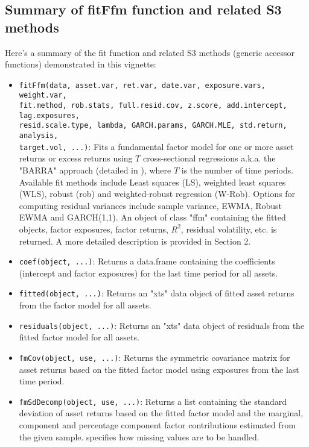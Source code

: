 \documentclass[a4paper]{article}\usepackage[]{graphicx}\usepackage[]{color}
\begin{document}
\subsection{Summary of fitFfm function and related S3 methods}

Here's a summary of the fit function and related S3 methods (generic accessor functions) demonstrated in this vignette:

\begin{itemize}

\item \verb"fitFfm(data, asset.var, ret.var, date.var, exposure.vars, weight.var, " \\ \verb"fit.method, rob.stats, full.resid.cov, z.score, add.intercept, lag.exposures, " \\ \verb"resid.scale.type, lambda, GARCH.params, GARCH.MLE, std.return, analysis, " \\ \verb"target.vol, ...)": Fits a fundamental factor model for one or more asset returns or excess returns using $T$ cross-sectional regressions a.k.a. the "BARRA" approach (detailed in \citet{grinold2000active}), where $T$ is the number of time periods. Available fit methods include Least squares (LS), weighted least squares (WLS), robust (rob) and weighted-robust regression (W-Rob). Options for computing residual variances include sample variance, EWMA, Robust EWMA and GARCH(1,1). An object of class "ffm" containing the fitted objects, factor exposures, factor returns, $R^2$, residual volatility, etc. is returned. A more detailed description is provided in Section 2.

\item \verb"coef(object, ...)": Returns a data.frame containing the coefficients (intercept and factor exposures) for the last time period for all assets.

\item \verb"fitted(object, ...)": Returns an "xts" data object of fitted asset returns from the factor model for all assets.

\item \verb"residuals(object, ...)": Returns an "xts" data object of residuals from the fitted factor model for all assets.

\item \verb"fmCov(object, use, ...)": Returns the  symmetric covariance matrix for asset returns based on the fitted factor model using exposures from the last time period.

\item \verb"fmSdDecomp(object, use, ...)": Returns a list containing the standard deviation of asset returns based on the fitted factor model and the marginal, component and percentage component factor contributions estimated from the given sample.  specifies how missing values are to be handled.


\end{itemize}
\end{document}
